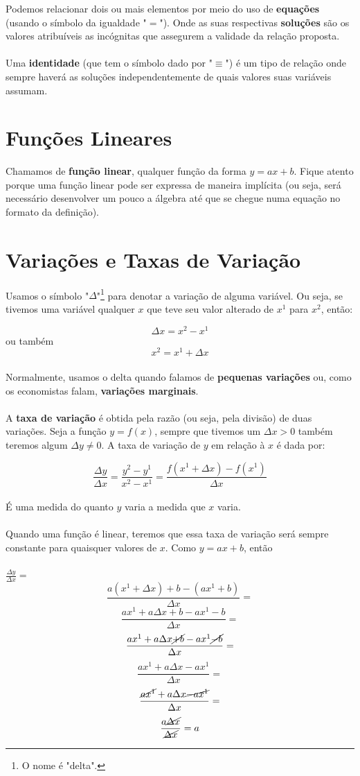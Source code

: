 \documentclass[a4paper,11pt,oneside]{book}
\theoremstyle{definition}
\theoremstyle{break}
\begin{document}
Podemos relacionar dois ou mais elementos por meio do uso de \textbf{equações} (usando o símbolo da igualdade "$=$"). Onde as suas respectivas \textbf{soluções} são os valores atribuíveis as incógnitas que assegurem a validade da relação proposta.
\\
\\
Uma \textbf{identidade} (que tem o símbolo dado por "$\equiv$") é um tipo de relação onde sempre haverá as soluções independentemente de quais valores suas variáveis assumam.

\section*{Funções Lineares}

Chamamos de \textbf{função linear}, qualquer função da forma $y = ax + b$. Fique atento porque uma função linear pode ser expressa de maneira implícita (ou seja, será necessário desenvolver um pouco a álgebra até que se chegue numa equação no formato da definição).

\section*{Variações e Taxas de Variação}

Usamos o símbolo "$\Delta$"\footnote{O nome é "delta".} para denotar a variação de alguma variável. Ou seja, se tivemos uma variável qualquer $x$ que teve seu valor alterado de $x^1$ para $x^2$, então:

$$ \Delta x = x^2 - x^1 $$
ou também
$$ x^2 = x^1 + \Delta x $$
\\
Normalmente, usamos o delta quando falamos de \textbf{pequenas variações} ou, como os economistas falam, \textbf{variações marginais}.
\\
\\
A \textbf{taxa de variação} é obtida pela razão (ou seja, pela divisão) de duas variações. Seja a função $y = f(x)$, sempre que tivemos um $\Delta x > 0$ também teremos algum $\Delta y \neq 0$. A taxa de variação de $y$ em relação à $x$ é dada por:

$$ \frac{\Delta y}{\Delta x} = \frac{y^2 - y^1}{x^2 - x^1} = \frac{f(x^1 + \Delta x) - f(x^1)}{\Delta x} $$
\\
É uma medida do quanto $y$ varia a medida que $x$ varia.
\\
\\
Quando uma função é linear, teremos que essa taxa de variação será sempre constante para quaisquer valores de $x$. Como $y = ax + b$, então
\\
\\
\Large $ \frac{\Delta y}{\Delta x} = $ \normalsize
$$ \frac{a(x^1 + \Delta x) + b - (ax^1 + b)}{\Delta x} = $$
$$ \frac{ax^1 + a\Delta x + b - ax^1 - b}{\Delta x} = $$
$$ \frac{ax^1 + a\Delta x \cancel{+ b} - ax^1 \cancel{- b}}{\Delta x} = $$
$$ \frac{ax^1 + a\Delta x - ax^1}{\Delta x} = $$
$$ \frac{\cancel{ax^1} + a\Delta x \cancel{- ax^1}}{\Delta x} = $$
$$ \frac{a \cancel{\Delta x}}{\cancel{\Delta x}} = a$$
\end{document}
